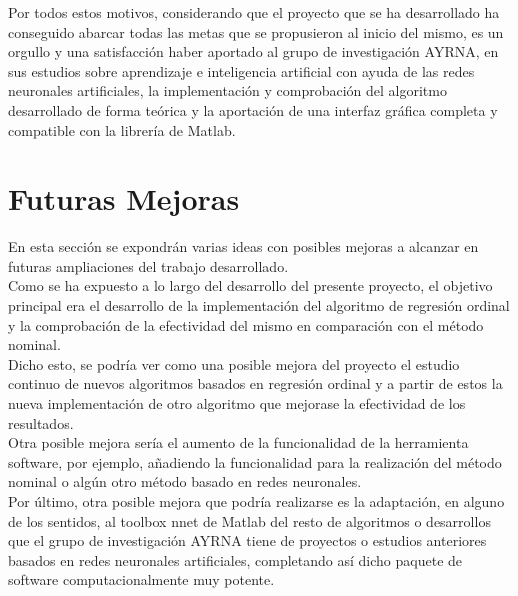 		Por todos estos motivos, considerando que el proyecto que se ha desarrollado ha conseguido abarcar todas las metas que se propusieron al inicio del mismo, es un orgullo y una satisfacción haber aportado al grupo de investigación AYRNA, en sus estudios sobre aprendizaje e inteligencia artificial con ayuda de las redes neuronales artificiales, la implementación y comprobación del algoritmo desarrollado de forma teórica y la aportación de una interfaz gráfica completa y compatible con la librería de Matlab.
		
	\section{Futuras Mejoras}
		
		En esta sección se expondrán varias ideas con posibles mejoras a alcanzar en futuras ampliaciones del trabajo desarrollado.\\
		
		Como se ha expuesto a lo largo del desarrollo del presente proyecto, el objetivo principal era el desarrollo de la implementación del algoritmo de regresión ordinal y la comprobación de la efectividad del mismo en comparación con el método nominal.\\
		
		Dicho esto, se podría ver como una posible mejora del proyecto el estudio continuo de nuevos algoritmos basados en regresión ordinal y a partir de estos la nueva implementación de otro algoritmo que mejorase la efectividad de los resultados.\\
		
		Otra posible mejora sería el aumento de la funcionalidad de la herramienta software, por ejemplo, añadiendo la funcionalidad para la realización del método nominal o algún otro método basado en redes neuronales.\\
		
		Por último, otra posible mejora que podría realizarse es la adaptación, en alguno de los sentidos, al toolbox nnet de Matlab del resto de algoritmos o desarrollos que el grupo de investigación AYRNA tiene de proyectos o estudios anteriores basados en redes neuronales artificiales, completando así dicho paquete de software computacionalmente muy potente.

